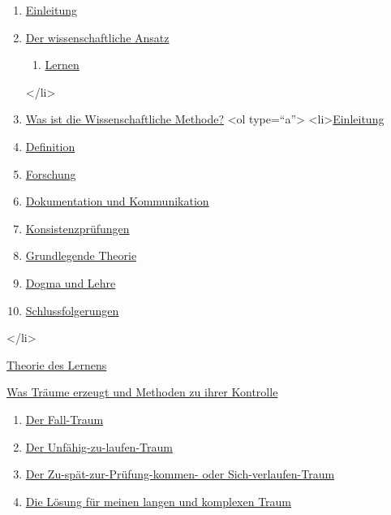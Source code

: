 {\begin{enumerate} 
 \item \hyperref[c3_1]{Einleitung}
 \item \hyperref[c3_2]{Der wissenschaftliche Ansatz}
  \begin{enumerate}[label={\alph*.}] 
   <li>\hyperref[c3_2a]{Einleitung}
   \item \hyperref[c3_2b]{Lernen}
  \end{enumerate}
 </li>
 \item \hyperref[c3_3]{Was ist die Wissenschaftliche Methode?}
  <ol type=\enquote{a}>
   <li>\hyperref[c3_3a]{Einleitung}
   \item \hyperref[c3_3b]{Definition}
   \item \hyperref[c3_3c]{Forschung}
   \item \hyperref[c3_3d]{Dokumentation und Kommunikation}
   \item \hyperref[c3_3e]{Konsistenzprüfungen}
   \item \hyperref[c3_3f]{Grundlegende Theorie}
   \item \hyperref[c3_3g]{Dogma und Lehre}
   \item \hyperref[c3_3h]{Schlussfolgerungen}
   \end{enumerate}
 </li>
 \item \hyperref[c3_4]{Theorie des Lernens}
 \item \hyperref[c3_5]{Was Träume erzeugt und Methoden zu ihrer Kontrolle}
  \begin{enumerate}[label={\alph*.}] 
   <li>\hyperref[c3_5a]{Einleitung}
   \item \hyperref[c3_5b]{Der Fall-Traum}
   \item \hyperref[c3_5c]{Der Unfähig-zu-laufen-Traum}
   \item \hyperref[c3_5d]{Der Zu-spät-zur-Prüfung-kommen- oder Sich-verlaufen-Traum}
   \item \hyperref[c3_5e]{Die Lösung für meinen langen und komplexen Traum}

\end{enumerate}}
